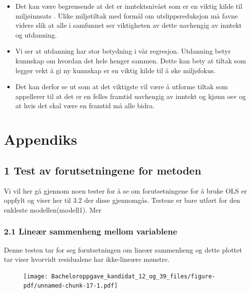 \documentclass[
  12pt,
  letterpaper,
  DIV=11,
  numbers=noendperiod]{scrartcl}
\begin{document}
\begin{itemize}
\item
  Det kan være begrensende at det er inntektsnivået som er en viktig
  kilde til miljøinnsats . Ulike miljøtiltak med formål om
  utslippsreduksjon må favne videre slik at alle i samfunnet ser
  viktigheten av dette uavhengig av inntekt og utdanning.
\item
  Vi ser at utdanning har stor betydning i vår regresjon. Utdanning
  betyr kunnskap om hvordan det hele henger sammen. Dette kan bety at
  tiltak som legger vekt å gi ny kunnskap er en viktig kilde til å øke
  miljøfokus.
\item
  Det kan derfor se ut som at det viktigste vil være å utforme tiltak
  som appellerer til at det er en felles framtid uavhengig av inntekt og
  kjønn osv og at hvis det skal være en framtid må alle bidra.
\end{itemize}

\newpage

\hypertarget{appendiks}{%
\section{Appendiks}\label{appendiks}}

\hypertarget{test-av-forutsetningene-for-metoden}{%
\subsection{1 Test av forutsetningene for
metoden}\label{test-av-forutsetningene-for-metoden}}

Vi vil her gå gjennom noen tester for å se om forutsetningene for å
bruke OLS er oppfylt og viser her til 3.2 der disse gjennomgås. Testene
er bare utført for den enkleste modellen(modell1). Mer

\hypertarget{lineuxe6r-sammenheng-mellom-variablene}{%
\subsubsection{2.1 Lineær sammenheng mellom
variablene}\label{lineuxe6r-sammenheng-mellom-variablene}}

Denne testen tar for seg forutsetningen om lineær sammenheng og dette
plottet tar viser hvorvidt residualene har ikke-lineære mønstre.

\begin{figure}[H]

{\centering \texttt{[image: Bacheloroppgave\_kandidat\_12\_og\_39\_files/figure-pdf/unnamed-chunk-17-1.pdf]}

}

\end{figure}
\end{document}

